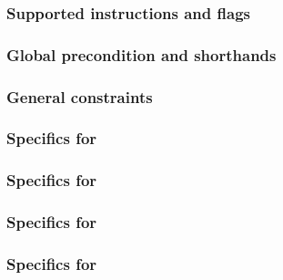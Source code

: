 
\subsubsection{Supported instructions and flags}                    \label{hub: instruction handling: logs: instruction flags}   
\subsubsection{Global precondition and shorthands   \lispDone{}}    \label{hub: instruction handling: logs: shorthands}          
\subsubsection{General constraints                  \lispDone{}}    \label{hub: instruction handling: logs: constraints}         
\subsubsection{Specifics for     \lispDone{}}    \label{hub: instruction handling: logs: calldatadopy}        
\subsubsection{Specifics for   \lispDone{}}    \label{hub: instruction handling: logs: returndatacopy}      
\subsubsection{Specifics for         \lispDone{}}    \label{hub: instruction handling: logs: codecopy}            
\subsubsection{Specifics for      \lispDone{}}    \label{hub: instruction handling: logs: extcodecopy}         

